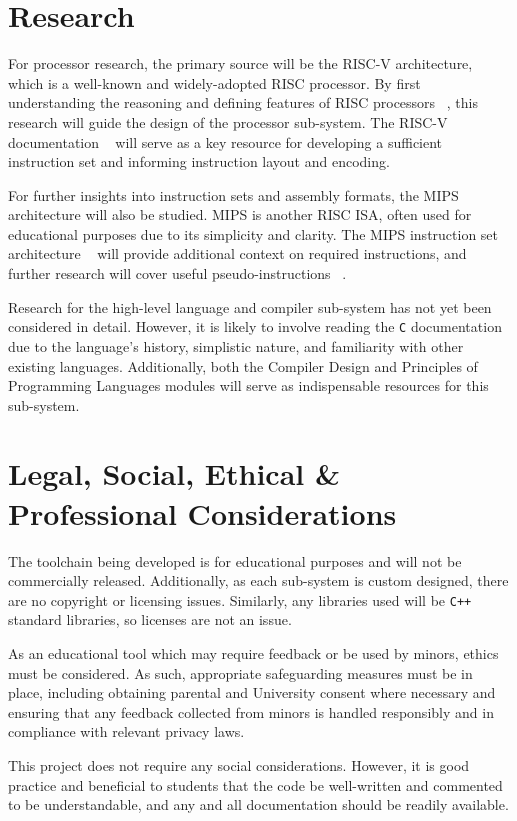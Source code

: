 \documentclass{article}
\begin{document}
    \section{Research}\label{sec:research}

    For processor research, the primary source will be the RISC-V architecture, which is a well-known and widely-adopted RISC processor.
    By first understanding the reasoning and defining features of RISC processors ~\cite{risc-vs-cisc}, this research will guide the design of the processor sub-system.
    The RISC-V documentation ~\cite{riscv-docs} will serve as a key resource for developing a sufficient instruction set and informing instruction layout and encoding.

    For further insights into instruction sets and assembly formats, the MIPS architecture will also be studied.
    MIPS is another RISC ISA, often used for educational purposes due to its simplicity and clarity.
    The MIPS instruction set architecture ~\cite{mips-isa} will provide additional context on required instructions, and further research will cover useful pseudo-instructions ~\cite{mips-pseudo-instructions}.

    Research for the high-level language and compiler sub-system has not yet been considered in detail.
    However, it is likely to involve reading the \texttt{C} documentation due to the language's history, simplistic nature, and familiarity with other existing languages.
    Additionally, both the Compiler Design and Principles of Programming Languages modules will serve as indispensable resources for this sub-system.

    \section{Legal, Social, Ethical \& Professional Considerations}\label{sec:considerations}


    The toolchain being developed is for educational purposes and will not be commercially released.
    Additionally, as each sub-system is custom designed, there are no copyright or licensing issues.
    Similarly, any libraries used will be \texttt{C++} standard libraries, so licenses are not an issue.

    As an educational tool which may require feedback or be used by minors, ethics must be considered.
    As such, appropriate safeguarding measures must be in place, including obtaining parental and University consent where necessary and ensuring that any feedback collected from minors is handled responsibly and in compliance with relevant privacy laws.

    This project does not require any social considerations.
    However, it is good practice and beneficial to students that the code be well-written and commented to be understandable, and any and all documentation should be readily available.

    \printbibliography
\end{document}
